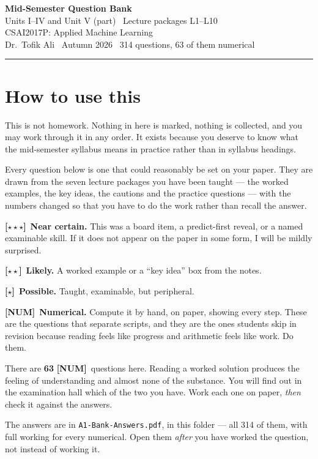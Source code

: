 \documentclass[11pt,a4paper]{article}
\newcommand{\CourseCode}{CSAI2017P: Applied Machine Learning}
\newcommand{\LA}{{\footnotesize\textbf{[$\star\star\star$]}}}
\newcommand{\LB}{{\footnotesize\textbf{[$\star\star$]}}}
\newcommand{\LC}{{\footnotesize\textbf{[$\star$]}}}
\newcommand{\NUM}{{\footnotesize\textbf{[NUM]}}}
\begin{document}
\begin{center}
  {\LARGE \textbf{Mid-Semester Question Bank}}\\[0.3em]
  {\large Units I--IV and Unit V (part) \textbullet\ Lecture packages L1--L10}\\[0.25em]
  {\large \CourseCode}\\[0.4em]
  \normalsize Dr.\ Tofik Ali \textbullet\ Autumn 2026 \textbullet\ 314 questions, 63 of them numerical
\end{center}
\vspace{0.4em}\hrule\vspace{0.8em}

\section*{How to use this}

This is not homework. Nothing in here is marked, nothing is collected, and you
may work through it in any order. It exists because you deserve to know what
the mid-semester syllabus means in practice rather than in syllabus headings.

Every question below is one that could reasonably be set on your paper. They
are drawn from the seven lecture packages you have been taught --- the worked
examples, the key ideas, the cautions and the practice questions --- with the
numbers changed so that you have to do the work rather than recall the answer.

\begin{infobox}
\LA\ \textbf{Near certain.} This was a board item, a predict-first reveal, or a
named examinable skill. If it does not appear on the paper in some form, I will
be mildly surprised.

\LB\ \textbf{Likely.} A worked example or a ``key idea'' box from the notes.

\LC\ \textbf{Possible.} Taught, examinable, but peripheral.

\NUM\ \textbf{Numerical.} Compute it by hand, on paper, showing every step.
These are the questions that separate scripts, and they are the ones students
skip in revision because reading feels like progress and arithmetic feels like
work. Do them.
\end{infobox}

\begin{warnbox}
There are \textbf{63} \NUM\ questions here. Reading a worked solution produces
the feeling of understanding and almost none of the substance. You will find
out in the examination hall which of the two you have. Work each one on paper,
\emph{then} check it against the answers.

The answers are in \texttt{A1-Bank-Answers.pdf}, in this folder --- all 314 of
them, with full working for every numerical. Open them \emph{after} you have
worked the question, not instead of working it.
\end{warnbox}
\end{document}
